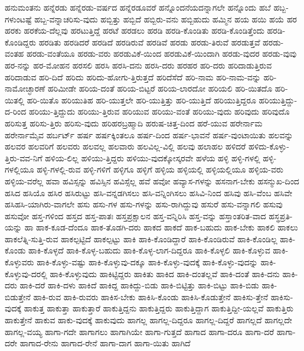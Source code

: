 {ಹನುಮಂತನು
ಹನ್ನೆರಡು
ಹನ್ನೆರಡು-ವರ್ಷದ
ಹನ್ನೆರಡೂವರೆ
ಹನ್ನೊಂದನೆಯದನ್ನಾಗಲೇ
ಹನ್ನೊಂದು
ಹಬೆ
ಹಬ್ಬ-ಗಳುಂಟಷ್ಟೆ
ಹಬ್ಬ-ವನ್ನಾಚರಿಸು-ವುದು
ಹಬ್ಬಿತ್ತು
ಹಬ್ಬಿದೆ
ಹಬ್ಬಿರು-ವನು
ಹಬ್ಬಿಹುದು
ಹಮ್ಮಿನ
ಹಯ
ಹಯಿ
ಹಯೆ
ಹರ
ಹರಕು
ಹರಕೆಯ-ದೆಲ್ಲವು
ಹರಟುತ್ತಿದ್ದೆ
ಹರಟೆ
ಹರಡಲು
ಹರಡಿ
ಹರಡಿ-ಕೊಂಡಿತು
ಹರಡಿ-ಕೊಂಡಿತ್ತೆಂದು
ಹರಡಿ-ಕೊಂಡಿದ್ದರು
ಹರಡಿತು
ಹರಡಿದರೆ
ಹರಡಿದೆ
ಹರಡಿರುವೆ
ಹರಡಿವೆ
ಹರಡು
ಹರಡು-ತಿರುವೆ
ಹರಡುತ್ತವೆ
ಹರಡು-ವಂತಹ
ಹರಡು-ವಂತೆಯೂ
ಹರಡು-ವರು
ಹರಡುವಿಕೆ-ಯಿಂದ
ಹರಡುವಿಕೆ-ಯಿಂದಾಗಿ
ಹರಡು-ವುದರ
ಹರಡು-ವುವು
ಹರ-ನನ್ನು
ಹರ-ಮೋಹನ
ಹರಸಲಿ
ಹರಸಿ
ಹರಸಿ-ದನು
ಹರಸಿ-ದರು
ಹರಹರ
ಹರಿ-ದರು
ಹರಿದಾಡುತ್ತಿರುವ
ಹರಿದಾಡುವ
ಹರಿ-ದಿದೆ
ಹರಿದು
ಹರಿದು-ಹೋಗು-ತ್ತಿರುತ್ತದೆ
ಹರಿದೆಸೆದೆ
ಹರಿ-ನಾಮ
ಹರಿ-ನಾಮ-ವನ್ನು
ಹರಿ-ನಾಮೋಚ್ಛಾರಣೆ
ಹರಿಮೀಡೇ
ಹರಿಯ-ದಂತೆ
ಹರಿಯ-ಬಿಟ್ಟರೆ
ಹರಿಯ-ಲಾರದೋ
ಹರಿಯಲಿ
ಹರಿ-ಯಿತದೊ
ಹರಿ-ಯಿತಲ್ಲಿ
ಹರಿ-ಯಿತೊ
ಹರಿಯುತಿಹ
ಹರಿ-ಯುತ್ತಲೇ
ಹರಿ-ಯುತ್ತಿತ್ತು
ಹರಿ-ಯುತ್ತಿದೆ
ಹರಿಯುತ್ತಿದ್ದರೂ
ಹರಿಯುತ್ತಿದ್ದು-ದ-ರಿಂದ
ಹರಿಯು-ತ್ತಿದ್ದುದು
ಹರಿಯು-ತ್ತಿರುವ
ಹರಿಯುವ
ಹರಿಯು-ವಂತೆ
ಹರಿಯು-ವುದು
ಹರಿವುದು
ಹರಿವುದೊ
ಹರಿಸುತ್ತ
ಹರಿಸು-ತ್ತಿರು
ಹರಿಸು-ವುದು
ಹರಿಹರಬ್ರಹ್ಮಾದಿ
ಹರುಷ-ಚಿತ್ತ-ದಿಂದ
ಹರೆ-ಯುವ
ಹರೇರ್ನಾಮ
ಹರೇರ್ನಾಮೈವ
ಹರ್ಬರ್ಟ್
ಹರ್ಷ
ಹರ್ಷಕ್ಕಿಂತಲೂ
ಹರ್ಷ-ದಿಂದ
ಹರ್ಷ-ಭಾವನೆ
ಹರ್ಷ-ವುಂಟಾಯಿತು
ಹಲವನ್ನು
ಹಲವರ
ಹಲವರಿಗೆ
ಹಲವರು
ಹಲವಲ್ಲ
ಹಲವಾರು
ಹಲವಿಲ್ಲ-ವಿಲ್ಲಿ
ಹಲವು
ಹಲಾಹಲ
ಹಳಿದರೆ
ಹಳಿದು-ಕೊಳ್ಳು-ತ್ತಿರು-ವವ-ನಿಗೆ
ಹಳಿಯ-ಲಿಲ್ಲ
ಹಳಿಯು-ತ್ತಿದ್ದರು
ಹಳಿಯು-ವುದಕ್ಕೋಸ್ಕರವೇ
ಹಳೆಯ
ಹಳ್ಳಿ
ಹಳ್ಳಿ-ಗಳಲ್ಲಿ
ಹಳ್ಳಿ-ಗಳಲ್ಲಿಯೂ
ಹಳ್ಳಿ-ಗಳಲ್ಲಿ-ರುವ
ಹಳ್ಳಿ-ಗಳಿಗೆ
ಹಳ್ಳಿಗೂ
ಹಳ್ಳಿಗೆ
ಹಳ್ಳಿಯ
ಹಳ್ಳಿಯಲ್ಲಿ
ಹಳ್ಳಿಯಲ್ಲಿಯೂ
ಹಳ್ಳಿಯ-ವರು
ಹಳ್ಳಿಯ-ವರೆಲ್ಲ
ಹವಾ
ಹವಿಸ್ಸನ್ನು
ಹವಿಸ್ಸಿನ
ಹವಿಸ್ಸೆಲ್ಲ
ಹವೆ
ಹವೋ
ಹವ್ಯಾಸ-ಗಳನ್ನು
ಹಸನಾಗ-ಬೇಕು
ಹಸನ್ಮುಖ-ದಿಂದ
ಹಸಿದ
ಹಸಿಯೊ
ಹಸಿರ
ಹಸಿರುಟ್ಟು
ಹಸಿ-ವನ್ನಡಗಿಸಲು
ಹಸಿ-ವನ್ನಿಂಗಿಸಲು
ಹಸಿವಿ-ನಿಂದ
ಹಸಿವು
ಹಸಿ-ವೆಂಬ
ಹಸಿವೇ
ಹಸಿಹಸಿ-ಯಾಗಿರು-ವಾಗಲೇ
ಹಸು
ಹಸು-ಗಳ
ಹಸು-ಗಳನ್ನು
ಹಸು-ರಾಗಿದ್ದುವು
ಹಸುರೆ
ಹಸು-ವನ್ನಾಗಲಿ
ಹಸುವು
ಹಸುವೋ
ಹಸ್ತ-ಗಳಿಂದ
ಹಸ್ತದ
ಹಸ್ತ-ಪಾತಃ
ಹಸ್ತಪ್ರಕ್ಷಾಲನ
ಹಸ್ತ-ವನ್ನಿರಿಸಿ
ಹಸ್ತ-ವನ್ನು
ಹಸ್ತಾಂತರಿತ-ವಾದ
ಹಸ್ಥಪ್ರತಿ-ಯನ್ನು
ಹಾ
ಹಾಕ-ಕೂಡ-ದೆಂದೂ
ಹಾಕ-ತೊಡಗಿ-ದರು
ಹಾಕದ
ಹಾಕದೆ
ಹಾಕ-ಬಹುದು
ಹಾಕ-ಬೇಕು
ಹಾಕಲಿ
ಹಾಕಲು
ಹಾಕಲೆತ್ನಿ-ಸುತ್ತಿ-ರುವ
ಹಾಕಲ್ಪಟ್ಟಿದೆ
ಹಾಕಲ್ಪಟ್ಟು
ಹಾಕಿ
ಹಾಕಿ-ಕೊಂಡಿದ್ದಾರೆ
ಹಾಕಿ-ಕೊಂಡಿರುವೆ
ಹಾಕಿ-ಕೊಂಡಿಲ್ಲ
ಹಾಕಿ-ಕೊಂಡು
ಹಾಕಿ-ಕೊಳ್ಳದೆ
ಹಾಕಿ-ಕೊಳ್ಳ-ಬಹುದು
ಹಾಕಿ-ಕೊಳ್ಳ-ಲಾಗ-ದಿದ್ದರೂ
ಹಾಕಿ-ಕೊಳ್ಳಲಿ
ಹಾಕಿ-ಕೊಳ್ಳುವ
ಹಾಕಿ-ಕೊಳ್ಳುವರು
ಹಾಕಿ-ಕೊಳ್ಳು-ವಷ್ಟು
ಹಾಕಿ-ಕೊಳ್ಳುವು-ದಕ್ಕೂ
ಹಾಕಿ-ಕೊಳ್ಳು-ವುದಕ್ಕೆ
ಹಾಕಿ-ಕೊಳ್ಳು-ವುದನ್ನು
ಹಾಕಿ-ಕೊಳ್ಳುವು-ದರಲ್ಲಿ
ಹಾಕಿ-ಕೊಳ್ಳುವುದು
ಹಾಕಿಟ್ಟಿದ್ದರು
ಹಾಕಿತು
ಹಾಕಿದ
ಹಾಕಿ-ದಂತಲ್ಲವೆ
ಹಾಕಿ-ದಂತೆ
ಹಾಕಿ-ದನು
ಹಾಕಿ-ದರು
ಹಾಕಿ-ದರೆ
ಹಾಕಿ-ದಳು
ಹಾಕಿದೆ
ಹಾಕಿದ್ದ
ಹಾಕಿದ್ದು-ಬಿಡು
ಹಾಕಿ-ಬಿಟ್ಟಿತ್ತು
ಹಾಕಿ-ಬಿಟ್ಟು
ಹಾಕಿ-ಬಿಡು
ಹಾಕಿ-ಬಿಡುತ್ತೇನೆ
ಹಾಕಿ-ರುವ
ಹಾಕಿ-ರುವರು
ಹಾಕಿಸ-ಬೇಕು
ಹಾಕಿಸಿ-ಕೊಂಡು
ಹಾಕಿಸಿ-ಕೊಡುತ್ತೇನೆ
ಹಾಕಿಸು-ತ್ತೇನೆ
ಹಾಕಿಸು-ವುದಕ್ಕೆ
ಹಾಕುತ್ತ
ಹಾಕುತ್ತಾ
ಹಾಕುತ್ತಾರೆ
ಹಾಕುತ್ತಿದ್ದನು
ಹಾಕುತ್ತಿದ್ದರು
ಹಾಕುತ್ತಿದ್ದಾಗ
ಹಾಕುತ್ತಿದ್ದೀ-ಯಲ್ಲವೆ
ಹಾಕುತ್ತಿರು
ಹಾಕುತ್ತೇನೆ
ಹಾಕುವ
ಹಾಕು-ವುದಕ್ಕೆ
ಹಾಕುವುದು
ಹಾಗಲ್ಲ
ಹಾಗಲ್ಲ-ದಿದ್ದರೂ
ಹಾಗಲ್ಲ-ದಿದ್ದರೆ
ಹಾಗಲ್ಲದೆ
ಹಾಗಲ್ಲದೇ
ಹಾಗಲ್ಲ-ವಯ್ಯ
ಹಾಗಾ-ಗದೇ
ಹಾಗಾಗಲು
ಹಾಗಾಗಿಯೇ
ಹಾಗಾ-ಗುತ್ತದೆ
ಹಾಗಾದ
ಹಾಗಾ-ದರೂ
ಹಾಗಾ-ದರೆ
ಹಾಗಾ-ದರೇ
ಹಾಗಾದ-ರೇನು
ಹಾಗಾದ-ರೇನೆ
ಹಾಗಾ-ದಾಗ
ಹಾಗಾ-ಯಿತು
ಹಾಗಿದೆ
}
